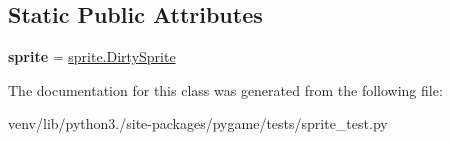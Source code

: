 \subsection*{Static Public Attributes}
\begin{DoxyCompactItemize}
\item 
\mbox{\label{classpygame_1_1tests_1_1sprite__test_1_1_layered_dirty_type_test_____dirty_sprite_a3246e5245748834b5b94659941ac42bb}} 
{\bfseries sprite} = \hyperlink{classpygame_1_1sprite_1_1_dirty_sprite}{sprite.\+Dirty\+Sprite}
\end{DoxyCompactItemize}


The documentation for this class was generated from the following file\+:\begin{DoxyCompactItemize}
\item 
venv/lib/python3./site-\/packages/pygame/tests/sprite\+\_\+test.\+py\end{DoxyCompactItemize}
